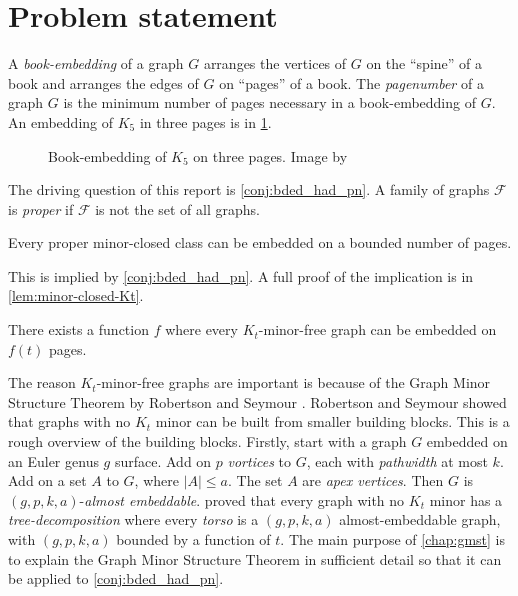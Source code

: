 \section{Problem statement}

A \textit{book-embedding} of a graph $G$ arranges the vertices of $G$ on the ``spine'' of a book and arranges the edges of $G$ on ``pages'' of a book. The \textit{pagenumber} of a graph \(G\) is the minimum number of pages necessary in a book-embedding of \(G\).
An embedding of $K_5$ in three pages is in \cref{fig:book-embedding}.

\begin{figure}[h!]
	\centering
	
	\caption[Three-page book-embedding of $K_5$]{Book-embedding of $K_5$ on three pages. Image by \textcite{eppsteinBookEmbedding2014}}\label{fig:book-embedding}
\end{figure}

The driving question of this report is \cref{conj:bded_had_pn}. A family of graphs $\mathcal{F}$ is \textit{proper} if $\mathcal{F}$ is not the set of all graphs. 
\begin{conjecture}\label{lem:Minor-Closed_Pagenumber}
	Every proper minor-closed class can be embedded on a bounded number of pages.
\end{conjecture}

This is implied by \cref{conj:bded_had_pn}. A full proof of the implication is in \cref{lem:minor-closed-Kt}.

\begin{conjecture}\label{conj:bded_had_pn}
	There exists a function $f$ where every $K_t$-minor-free graph can be embedded on $f(t)$ pages.
\end{conjecture}

The reason $K_t$-minor-free graphs are important is because of the Graph Minor Structure Theorem by Robertson and Seymour \cite{robertsonGraphMinorsXVI2003}. Robertson and Seymour showed that graphs with no \(K_t\) minor can be built from smaller building blocks. This is a rough overview of the building blocks. Firstly, start with a graph \(G\) embedded on an Euler genus \(g\) surface. Add on \(p\) \textit{vortices} to \(G\), each with \textit{pathwidth} at most \(k\). Add on a set $A$ to \(G\), where $|A| \leq a$. The set $A$ are \textit{apex vertices}. Then \(G\) is \((g, p, k, a)\)-\textit{almost embeddable}. \textcite{robertsonGraphMinorsXVI2003} proved that every graph with no \(K_t\) minor has a \textit{tree-decomposition} where every \textit{torso} is a \((g, p, k, a)\) almost-embeddable graph, with \((g, p, k, a)\) bounded by a function of \(t\). The main purpose of \cref{chap:gmst} is to explain the Graph Minor Structure Theorem in sufficient detail so that it can be applied to \cref{conj:bded_had_pn}.

